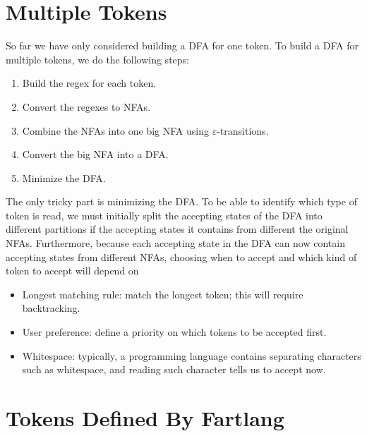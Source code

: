 \documentclass[titlepage]{article}
\theoremstyle{plain}
\theoremstyle{definition}
\theoremstyle{remark}
\begin{document}
\section{Multiple Tokens}
So far we have only considered building a DFA for one token. To build a DFA
for multiple tokens, we do the following steps:
\begin{enumerate}
  \item Build the regex for each token.
  \item Convert the regexes to NFAs.
  \item Combine the NFAs into one big NFA using $\varepsilon$-transitions.
  \item Convert the big NFA into a DFA\@.
  \item Minimize the DFA\@.
\end{enumerate}
The only tricky part is minimizing the DFA\@. To be able to identify which
type of token is read, we must initially split the accepting states of the DFA
into different partitions if the accepting states it contains from different
the original NFAs. Furthermore, because each accepting state in the DFA can now
contain accepting states from different NFAs, choosing when to accept and which
kind of token to accept will depend on
\begin{itemize}
  \item Longest matching rule: match the longest token; this will require
    backtracking.
  \item User preference: define a priority on which tokens to be accepted first.
  \item Whitespace: typically, a programming language contains separating
    characters such as whitespace, and reading such character tells us to
    accept now.
\end{itemize}

\section{Tokens Defined By Fartlang}
\end{document}
